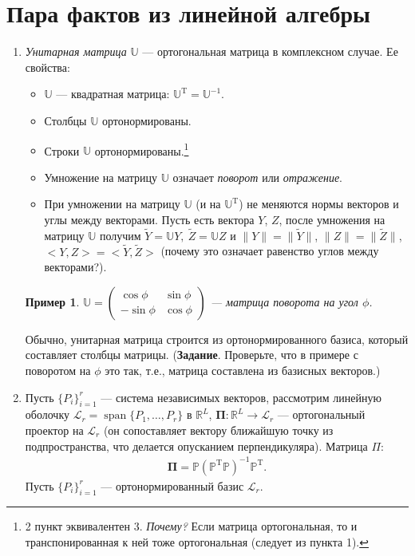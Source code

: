 \documentclass[specialist, 12pt,
subf, %
href, colorlinks=true,
substylefile = spbu.rtx,
]{disser}
\newtheorem{example}{Пример}
\DeclareMathOperator{\spn}{span}
\begin{document}
\section{Пара фактов из линейной алгебры}
\begin{enumerate}
	\item \textit{Унитарная матрица} $\mathbb{U}$ --- ортогональная матрица в комплексном случае. Ее свойства:
	\begin{itemize}
		\item $\mathbb{U}$ --- квадратная матрица: $\mathbb{U}^{\mathrm{T}} =\mathbb{U}^{-1}$.
		\item Столбцы $\mathbb{U}$ ортонормированы.
		\item Строки $\mathbb{U}$ ортонормированы.\footnote{2 пункт эквивалентен 3. \textit{Почему?} Если матрица ортогональная, то и транспонированная к ней тоже ортогональная (следует из пункта 1).}
\item Умножение на матрицу $\mathbb{U}$ означает \textit{поворот} или \textit{отражение}.
\item При умножении на матрицу $\mathbb{U}$ (и на $\mathbb{U}^\mathrm{T}$) не меняются нормы векторов и углы между векторами. Пусть есть вектора $Y$, $Z$, после умножения на матрицу $\mathbb{U}$ получим $\widetilde{Y} = \mathbb{U}Y,~ \widetilde{Z}=\mathbb{U}Z$ и $\|Y\| = \|\widetilde{Y}\|$, $\|Z\| = \|\widetilde{Z}\|$, $<Y,Z> = <\widetilde{Y}, \widetilde{Z}>$ (почему это означает равенство углов
    между векторами?).
	\end{itemize}


\begin{example}
	 $\mathbb{U} = \begin{pmatrix}
	\cos \phi & \sin \phi\\
	-\sin \phi & \cos \phi
	\end{pmatrix}$ --- матрица поворота на угол $\phi$.
\end{example}

Обычно, унитарная матрица строится из ортонормированного базиса, который составляет столбцы
матрицы. (\textbf{Задание}. Проверьте, что в примере с поворотом на $\phi$ это так, т.е., матрица составлена из базисных векторов.)

\item Пусть $\{P_i\}_{i = 1}^r$ --- система независимых векторов, рассмотрим линейную оболочку $\mathcal{L}_r = \spn\{P_1, \ldots, P_r\}$ в $\mathbb{R}^L$, $\bm\Pi: \mathbb{R}^L \rightarrow \mathcal{L}_r$ --- ортогональный проектор на $\mathcal{L}_r$ (он сопоставляет вектору ближайшую точку из подпространства,
    что делается опусканием перпендикуляра). Матрица $\Pi$:
\begin{gather*}
\bm\Pi = \mathbb{P} (\mathbb{P}^{\mathrm{T}} \mathbb{P})^{-1} \mathbb{P}^{\mathrm{T}}.
\end{gather*}
Пусть $\{P_i\}_{i = 1}^r$ --- ортонормированный базис $\mathcal{L}_r$.



\end{enumerate}
\end{document}
